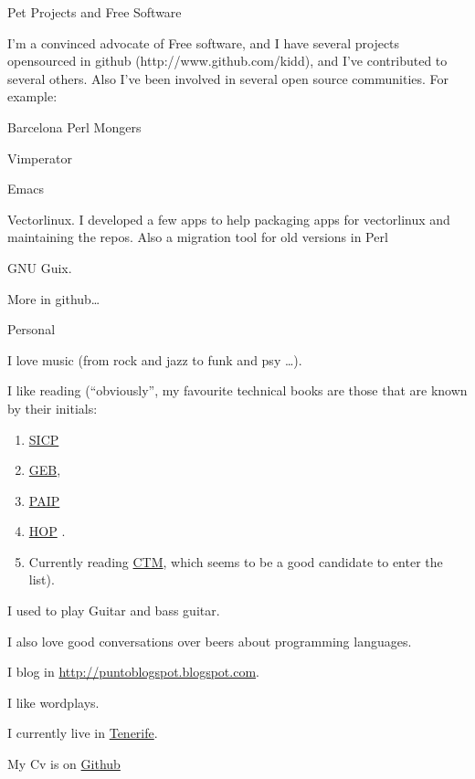 \documentclass{resume} %
\begin{document}
\begin{rSection}{Pet Projects and Free Software}

  I'm a convinced advocate of Free software, and I have several
  projects opensourced in github (http://www.github.com/kidd), and
  I've contributed to several others. Also I've been involved in
  several open source communities. For example:

\item Barcelona Perl Mongers
\item Vimperator
\item Emacs
\item Vectorlinux. I developed a few apps to help packaging apps for
  vectorlinux and maintaining the repos. Also a migration tool for old
  versions in Perl
\item GNU Guix.
\item More in github\ldots
\end{rSection}

\begin{rSection}{Personal}

\item I love music (from rock and jazz to funk and psy \ldots).
\item I like reading (``obviously'', my favourite technical books are
  those that are known by their initials:
  \begin{enumerate}
  \item \href{https://mitpress.mit.edu/sicp/}{SICP}
  \item \href{https://en.wikipedia.org/wiki/G%C3%B6del,_Escher,_Bach}{GEB},
  \item \href{http://norvig.com/paip.html}{PAIP}
  \item \href{http://hop.perl.plover.com/}{HOP} .
  \item Currently reading
    \href{https://www.info.ucl.ac.be/~pvr/book.html}{CTM}, which seems
    to be a good candidate to enter the list).
  \end{enumerate}
\item I used to play Guitar and bass guitar.
\item I also love good conversations over beers about programming
  languages.

\item I blog in \url{http://puntoblogspot.blogspot.com}.
\item I like wordplays.
\item I currently live in \href{https://www.google.es/maps/place/Tenerife/@28.2925426,-17.0803948,9z/data=!3m1!4b1!4m2!3m1!1s0xc4029effe8682ed:0xb01a4bf1c84baf3c}{Tenerife}.
\item My Cv is on \href{https://github.com/kidd/Me}{Github}
\end{rSection}
\end{document}
